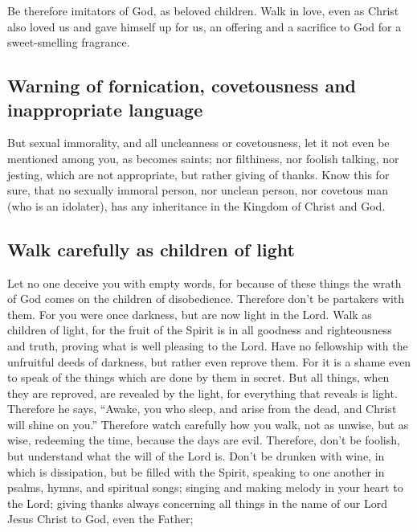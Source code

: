  Be therefore imitators of God, as beloved children.
 Walk in love, even as Christ also loved us and gave
himself up for us, an offering and a sacrifice to God for a
sweet-smelling fragrance.

\hypertarget{warning-of-fornication-covetousness-and-inappropriate-language}{%
\subsection{Warning of fornication, covetousness and inappropriate
language}\label{warning-of-fornication-covetousness-and-inappropriate-language}}

 But sexual immorality, and all uncleanness or
covetousness, let it not even be mentioned among you, as becomes saints;
 nor filthiness, nor foolish talking, nor jesting, which
are not appropriate, but rather giving of thanks.  Know
this for sure, that no sexually immoral person, nor unclean person, nor
covetous man (who is an idolater), has any inheritance in the Kingdom of
Christ and God.

\hypertarget{walk-carefully-as-children-of-light}{%
\subsection{Walk carefully as children of
light}\label{walk-carefully-as-children-of-light}}

 Let no one deceive you with empty words, for because of
these things the wrath of God comes on the children of disobedience.
 Therefore don't be partakers with them. 
For you were once darkness, but are now light in the Lord. Walk as
children of light,  for the fruit of the Spirit is in all
goodness and righteousness and truth,  proving what is
well pleasing to the Lord.  Have no fellowship with the
unfruitful deeds of darkness, but rather even reprove them.
 For it is a shame even to speak of the things which are
done by them in secret.  But all things, when they are
reproved, are revealed by the light, for everything that reveals is
light.  Therefore he says, ``Awake, you who sleep, and
arise from the dead, and Christ will shine on you.'' 
Therefore watch carefully how you walk, not as unwise, but as wise,
 redeeming the time, because the days are evil.
 Therefore, don't be foolish, but understand what the
will of the Lord is.  Don't be drunken with wine, in
which is dissipation, but be filled with the Spirit, 
speaking to one another in psalms, hymns, and spiritual songs; singing
and making melody in your heart to the Lord;  giving
thanks always concerning all things in the name of our Lord Jesus Christ
to God, even the Father;

